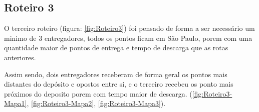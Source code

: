 \begin{center}
	\label{fig:Roteiro2-G1000P100-SwapMutation}
\end{center}


\subsection{Roteiro 3}

O terceiro roteiro (figura: \ref{fig:Roteiro3}) foi pensado de forma a ser necessário um minimo de 3 entregadores, todos os pontos ficam em São Paulo, porem com uma quantidade maior de pontos de entrega e tempo de descarga que as rotas anteriores.

Assim sendo, dois entregadores receberam de forma geral os pontos mais distantes do depósito e opostos entre si, e o terceiro  recebeu os ponto mais próximos do deposito   porem com tempo maior de descarga. (\ref{fig:Roteiro3-Mapa1}, \ref{fig:Roteiro3-Mapa2}, \ref{fig:Roteiro3-Mapa3}).



